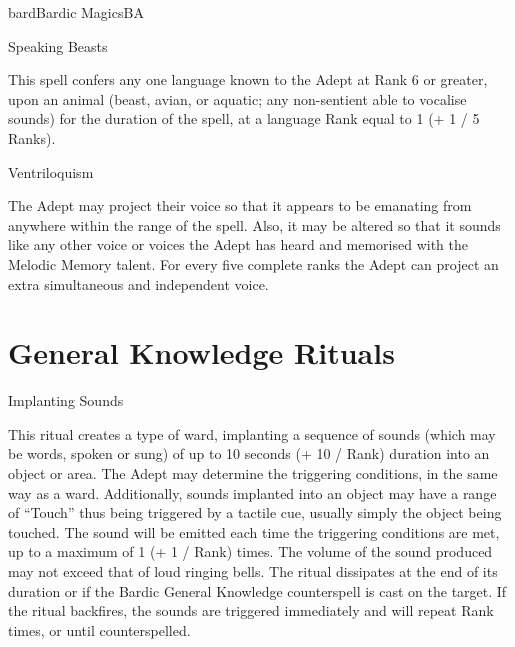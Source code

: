\begin{College}[2.1]{bard}{Bardic Magics}{BA}
\begin{spell}[G-10]{Speaking Beasts}

\begin{effects}
This spell confers any one language known to the Adept at Rank 6 or
greater, upon an animal (beast, avian, or aquatic; any non-sentient
able to vocalise sounds) for the duration of the spell, at a language
Rank equal to 1 (+ 1 / 5 Ranks).
\end{effects}
\end{spell}

\begin{spell}[G-10]{Ventriloquism}

\begin{effects}
The Adept may project their voice so that it appears to be emanating
from anywhere within the range of the spell.  Also, it may be altered
so that it sounds like any other voice or voices the Adept has heard
and memorised with the Melodic Memory talent.  For every five complete
ranks the Adept can project an extra simultaneous and independent
voice.
\end{effects}
\end{spell}


\section{General Knowledge Rituals}

\begin{ritual}[Q-1]{Implanting Sounds}

\begin{effects}
This ritual creates a type of ward, implanting a sequence of sounds
(which may be words, spoken or sung) of up to 10 seconds (+ 10 / Rank)
duration into an object or area.  The Adept may determine the
triggering conditions, in the same way as a ward. Additionally, sounds
implanted into an object may have a range of “Touch” thus being
triggered by a tactile cue, usually simply the object being touched.
The sound will be emitted each time the triggering conditions are met,
up to a maximum of 1 (+ 1 / Rank) times.  The volume of the sound
produced may not exceed that of loud ringing bells. The ritual
dissipates at the end of its duration or if the Bardic General
Knowledge counterspell is cast on the target.  If the ritual
backfires, the sounds are triggered immediately and will repeat Rank
times, or until counterspelled.
\end{effects}
\end{ritual}


\end{College}
